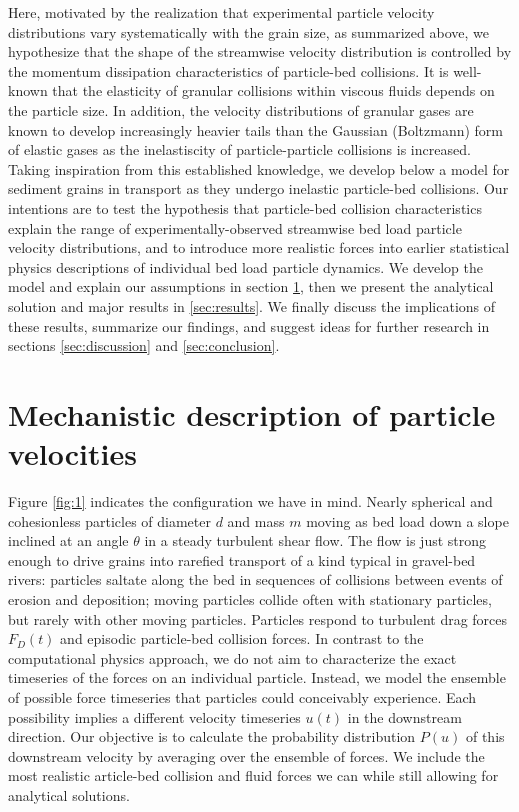 Here, motivated by the realization that experimental particle velocity distributions vary systematically with the grain size, as summarized above, we hypothesize that the shape of the streamwise velocity distribution is controlled by the momentum dissipation characteristics of particle-bed collisions.
It is well-known that the elasticity of granular collisions within viscous fluids depends on the particle size.
In addition, the velocity distributions of granular gases are known to develop increasingly heavier tails than the Gaussian (Boltzmann) form of elastic gases as the inelastiscity of particle-particle collisions is increased.
Taking inspiration from this established knowledge, we develop below a model for sediment grains in transport as they undergo inelastic particle-bed collisions. Our intentions are to test the hypothesis that particle-bed collision characteristics explain the range of experimentally-observed streamwise bed load particle velocity distributions, and to introduce more realistic forces into earlier statistical physics descriptions of individual bed load particle dynamics. 
We develop the model and explain our assumptions in section \ref{sec:model}, then we present the analytical solution and major results in \ref{sec:results}. We finally discuss the implications of these results, summarize our findings, and suggest ideas for further research in sections \ref{sec:discussion} and \ref{sec:conclusion}.


\section{Mechanistic description of particle velocities}
\label{sec:model}

Figure \ref{fig:1} indicates the configuration we have in mind. Nearly spherical and cohesionless particles of diameter $d$ and mass $m$ moving as bed load down a slope inclined at an angle $\theta$ in a steady turbulent shear flow. The flow is just strong enough to drive grains into rarefied transport of a kind typical in gravel-bed rivers: particles saltate along the bed in sequences of collisions between events of erosion and deposition; moving particles collide often with stationary particles, but rarely with other moving particles.
Particles respond to turbulent drag forces $F_D(t)$ and episodic particle-bed collision forces. In contrast to the computational physics approach, we do not aim to characterize the exact timeseries of the forces on an individual particle. Instead, we model the ensemble of possible force timeseries that particles could conceivably experience. Each possibility implies a different velocity timeseries $u(t)$ in the downstream direction.
Our objective is to calculate the probability distribution $P(u)$ of this downstream velocity by averaging over the ensemble of forces.
We include the most realistic article-bed collision and fluid forces we can while still allowing for analytical solutions. 

